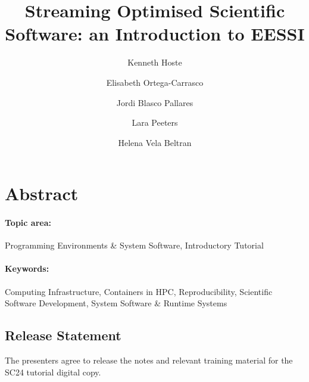 \documentclass[a4paper,11pt]{article}
\begin{document}

\title{
    \textbf{\LARGE Streaming Optimised Scientific Software: an Introduction to EESSI}\\
}

\date{}

\author[1]{Kenneth Hoste}
\author[2]{Elisabeth Ortega-Carrasco}
\author[3]{Jordi Blasco Pallares}
\author[1]{Lara Peeters}
\author[2]{Helena Vela Beltran}

\renewcommand\Authands{ and }

\maketitle


\section*{Abstract}


\paragraph{Topic area:} Programming Environments \& System Software, Introductory Tutorial

\paragraph{Keywords:} Computing Infrastructure, Containers in HPC, Reproducibility, Scientific Software Development, System Software \& Runtime Systems


\newpage




\newpage

\subsection*{Release Statement}

The presenters agree to release the notes and relevant training material for the SC24 tutorial digital copy.


\end{document}
